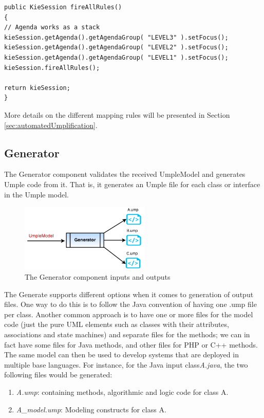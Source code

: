 \begin{lstlisting}[style=java, caption=Firing the rules in the Umplificator, label=lst:fireAllRules]
public KieSession fireAllRules()
{
// Agenda works as a stack
kieSession.getAgenda().getAgendaGroup( "LEVEL3" ).setFocus();
kieSession.getAgenda().getAgendaGroup( "LEVEL2" ).setFocus();
kieSession.getAgenda().getAgendaGroup( "LEVEL1" ).setFocus();
kieSession.fireAllRules();

return kieSession;
}
\end{lstlisting}

More details on the different mapping rules will be presented in Section \ref{sec:automatedUmplification}.

\subsection{Generator}

The Generator component validates the received UmpleModel and generates Umple code from it. That is, it generates an Umple file for each class or interface in the Umple model.

\begin{figure}[h]
\centering
\includegraphics[width=0.55\textwidth]{Figures/generatorINOut.png}
\caption{The Generator component inputs and outputs}
\label{fig:generatorInOut}
\end{figure}

The Generate supports different options when it comes to generation of output files.  One way to do this is to follow the Java convention of having one .ump file per class. Another common approach is to have one or more files for the model code (just the pure UML elements such as classes with their attributes, associations and state machines) and separate files for the methods; we can in fact have some files for Java methods, and other files for PHP or C++ methods. The same model can then be used to develop systems that are deployed in multiple base languages. For instance, for the Java  input class\textit{A.java}, the two following files would be generated:

\begin{enumerate}
\item \textit{A.ump}: containing methods, algorithmic and logic code for class A.
\item \textit{A\_model.ump}: Modeling constructs for class A.
\end{enumerate}

